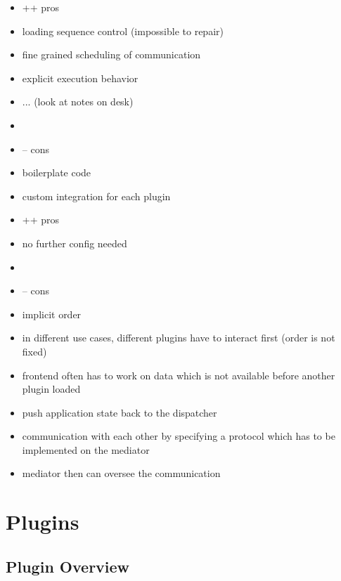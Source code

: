 \documentclass[../ClassicThesis.tex]{subfiles}
\begin{document}
\begin{itemize}
\item ++ pros
\item loading sequence control (impossible to repair)
\item fine grained scheduling of communication
\item explicit execution behavior
\item ... (look at notes on desk)
\item
\item -- cons
\item boilerplate code
\item custom integration for each plugin
\end{itemize}

\begin{itemize}
\item ++ pros
\item no further config needed
\item
\item -- cons
\item implicit order
\item in different use cases, different plugins have to interact first (order is
  not fixed)
\item frontend often has to work on data which is not available before another
  plugin loaded
\end{itemize}


\begin{itemize}
\item push application state back to the dispatcher
\item communication with each other by specifying a protocol which has to be
  implemented on the mediator
\item mediator then can oversee the communication
\end{itemize}

\section{Plugins}

\subsection{Plugin Overview}

\end{document}
